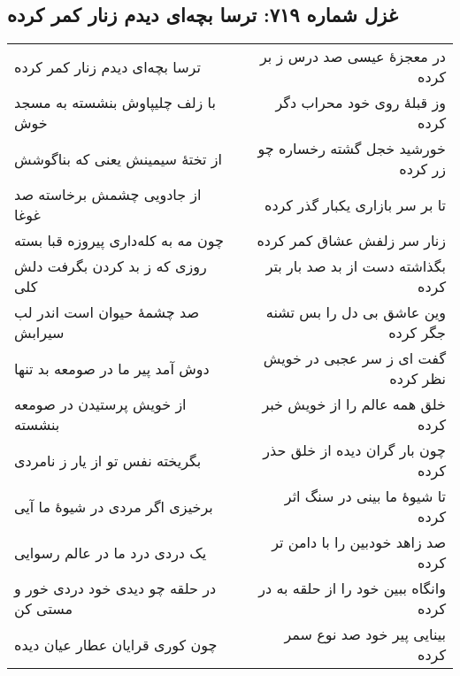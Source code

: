 \begin{center}
\section*{غزل شماره ۷۱۹: ترسا بچه‌ای دیدم زنار کمر کرده}
\label{sec:719}
\begin{longtable}{l p{0.5cm} r}
ترسا بچه‌ای دیدم زنار کمر کرده
&&
در معجزهٔ عیسی صد درس ز بر کرده
\\
با زلف چلیپاوش بنشسته به مسجد خوش
&&
وز قبلهٔ روی خود محراب دگر کرده
\\
از تختهٔ سیمینش یعنی که بناگوشش
&&
خورشید خجل گشته رخساره چو زر کرده
\\
از جادویی چشمش برخاسته صد غوغا
&&
تا بر سر بازاری یکبار گذر کرده
\\
چون مه به کله‌داری پیروزه قبا بسته
&&
زنار سر زلفش عشاق کمر کرده
\\
روزی که ز بد کردن بگرفت دلش کلی
&&
بگذاشته دست از بد صد بار بتر کرده
\\
صد چشمهٔ حیوان است اندر لب سیرابش
&&
وین عاشق بی دل را بس تشنه جگر کرده
\\
دوش آمد پیر ما در صومعه بد تنها
&&
گفت ای ز سر عجبی در خویش نظر کرده
\\
از خویش پرستیدن در صومعه بنشسته
&&
خلق همه عالم را از خویش خبر کرده
\\
بگریخته نفس تو از یار ز نامردی
&&
چون بار گران دیده از خلق حذر کرده
\\
برخیزی اگر مردی در شیوهٔ ما آیی
&&
تا شیوهٔ ما بینی در سنگ اثر کرده
\\
یک دردی درد ما در عالم رسوایی
&&
صد زاهد خودبین را با دامن تر کرده
\\
در حلقه چو دیدی خود دردی خور و مستی کن
&&
وانگاه ببین خود را از حلقه به در کرده
\\
چون کوری قرایان عطار عیان دیده
&&
بینایی پیر خود صد نوع سمر کرده
\\
\end{longtable}
\end{center}
